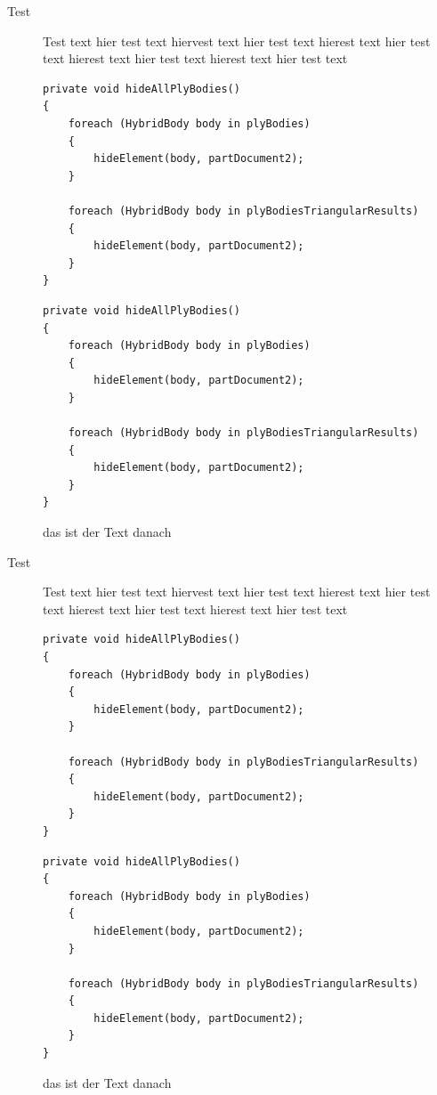 \documentclass[a4paper,11pt]{article}
\makeatletter
\let\@makecaption@CAPTION\@makecaption
\let\lst@MakeCaption@CAPTION\lst@MakeCaption}
\newcommand\Caption{\let\@makecaption\@makecaption@CAPTION\let\lst@MakeCaption\lst@MakeCaption@CAPTION}
\makeatother
\begin{document}
\begin{description}
        \item[Test] Test text hier test text hiervest text hier test text hierest text hier test text hierest text hier test text hierest text hier test text
        
\begin{lstlisting}[caption=Titel des Codes, captionpos=t]
private void hideAllPlyBodies()
{
    foreach (HybridBody body in plyBodies)
    {
        hideElement(body, partDocument2);
    }

    foreach (HybridBody body in plyBodiesTriangularResults)
    {
        hideElement(body, partDocument2);
    }
}
\end{lstlisting}
\begin{lstlisting}[caption=Titel des Codes, captionpos=b]
private void hideAllPlyBodies()
{
    foreach (HybridBody body in plyBodies)
    {
        hideElement(body, partDocument2);
    }

    foreach (HybridBody body in plyBodiesTriangularResults)
    {
        hideElement(body, partDocument2);
    }
}
\end{lstlisting}

das ist der Text danach

\end{description}

\Caption\captionsetup{box=none}

\begin{description}
        \item[Test] Test text hier test text hiervest text hier test text hierest text hier test text hierest text hier test text hierest text hier test text
        
\begin{lstlisting}[caption=Titel des Codes, captionpos=t]
private void hideAllPlyBodies()
{
    foreach (HybridBody body in plyBodies)
    {
        hideElement(body, partDocument2);
    }

    foreach (HybridBody body in plyBodiesTriangularResults)
    {
        hideElement(body, partDocument2);
    }
}
\end{lstlisting}
\begin{lstlisting}[caption=Titel des Codes, captionpos=b]
private void hideAllPlyBodies()
{
    foreach (HybridBody body in plyBodies)
    {
        hideElement(body, partDocument2);
    }

    foreach (HybridBody body in plyBodiesTriangularResults)
    {
        hideElement(body, partDocument2);
    }
}
\end{lstlisting}

das ist der Text danach

\end{description}
\end{document}
